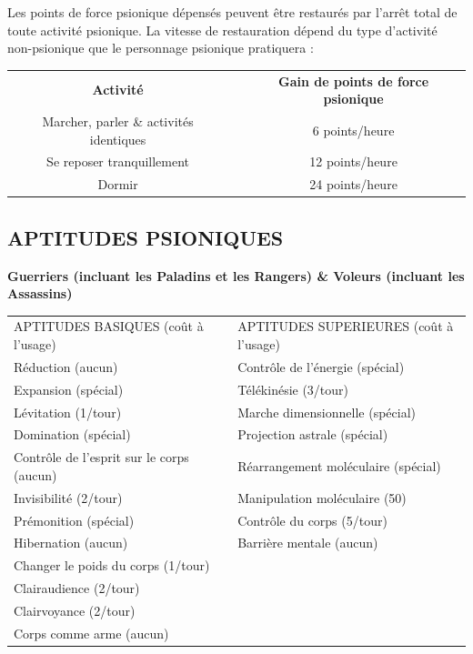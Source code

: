 \documentclass[11pt]{article}
\begin{document}
{Les points de force psionique dépensés peuvent être restaurés par l'arrêt total de toute activité psionique. La vitesse de restauration dépend du type d'activité non-psionique que le personnage psionique pratiquera :

\begin{center}
\begin{tabular}{cp{0.3cm}c}
\textbf{Activité} && \textbf{Gain de points de force psionique} \\
Marcher, parler \& activités identiques && 6 points/heure \\
Se reposer tranquillement && 12 points/heure \\
Dormir && 24 points/heure \\
\end{tabular}
\end{center}

\newpage
\subsection*{\normalsize APTITUDES PSIONIQUES}

\textbf{Guerriers (incluant les Paladins et les Rangers) \& Voleurs (incluant les Assassins)}

\bigskip

\begin{tabular}{p{7.5cm}p{0.3cm}p{7.5cm}}
APTITUDES BASIQUES (coût à l'usage) && APTITUDES SUPERIEURES (coût à l'usage) \\
Réduction (aucun) && Contrôle de l'énergie (spécial) \\
Expansion (spécial) && Télékinésie (3/tour) \\
Lévitation (1/tour) && Marche dimensionnelle (spécial) \\
Domination (spécial) && Projection astrale (spécial) \\
Contrôle de l'esprit sur le corps (aucun) && Réarrangement moléculaire (spécial) \\
Invisibilité (2/tour) && Manipulation moléculaire (50) \\
Prémonition (spécial) && Contrôle du corps (5/tour) \\
Hibernation (aucun) && Barrière mentale (aucun) \\
Changer le poids du corps (1/tour) && \\
Clairaudience (2/tour) && \\
Clairvoyance (2/tour) && \\
Corps comme arme (aucun) && \\
\end{tabular}

}
\end{document}
